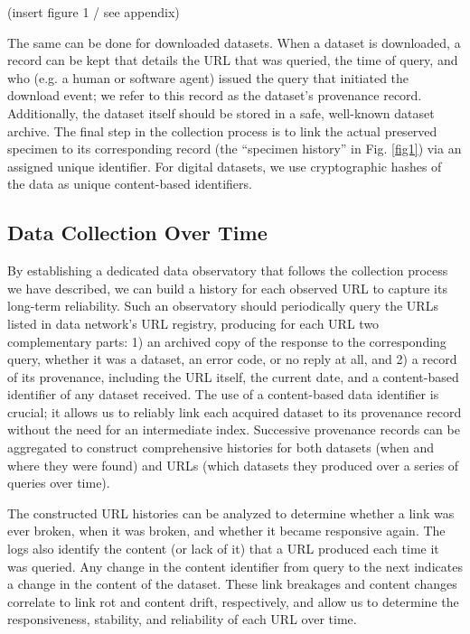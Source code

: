 % 
(insert figure 1 / see appendix)

The same can be done for downloaded datasets. When a dataset is downloaded, a record can be kept that details the URL that was queried, the time of query, and who (e.g. a human or software agent) issued the query that initiated the download event; we refer to this record as the dataset’s provenance record. Additionally, the dataset itself should be stored in a safe, well-known dataset archive. The final step in the collection process is to link the actual preserved specimen to its corresponding record (the “specimen history” in Fig. \ref{fig1}) via an assigned unique identifier. For digital datasets, we use cryptographic hashes of the data as unique content-based identifiers.

\subsection*{Data Collection Over Time}

By establishing a dedicated data observatory that follows the collection process we have described, we can build a history for each observed URL to capture its long-term reliability. Such an observatory should periodically query the URLs listed in data network’s URL registry, producing for each URL two complementary parts: 1) an archived copy of the response to the corresponding query, whether it was a dataset, an error code, or no reply at all, and 2) a record of its provenance, including the URL itself, the current date, and a content-based identifier of any dataset received. The use of a content-based data identifier is crucial; it allows us to reliably link each acquired dataset to its provenance record without the need for an intermediate index. Successive provenance records can be aggregated to construct comprehensive histories for both datasets (when and where they were found) and URLs (which datasets they produced over a series of queries over time).

The constructed URL histories can be analyzed to determine whether a link was ever broken, when it was broken, and whether it became responsive again. The logs also identify the content (or lack of it) that a URL produced each time it was queried. Any change in the content identifier from query to the next indicates a change in the content of the dataset. These link breakages and content changes correlate to link rot and content drift, respectively, and allow us to determine the responsiveness, stability, and reliability of each URL over time. 

